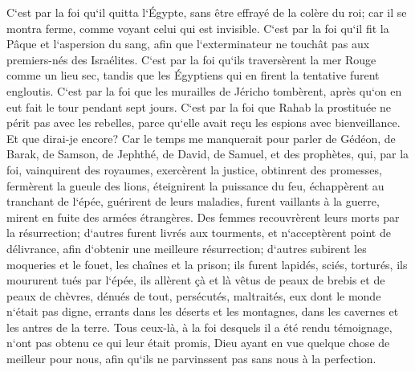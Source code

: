 \verse C`est par la foi qu`il quitta l`Égypte, sans être effrayé de la colère du roi; car il se montra ferme, comme voyant celui qui est invisible. 
\verse C`est par la foi qu`il fit la Pâque et l`aspersion du sang, afin que l`exterminateur ne touchât pas aux premiers-nés des Israélites. 
\verse C`est par la foi qu`ils traversèrent la mer Rouge comme un lieu sec, tandis que les Égyptiens qui en firent la tentative furent engloutis. 
\verse C`est par la foi que les murailles de Jéricho tombèrent, après qu`on en eut fait le tour pendant sept jours. 
\verse C`est par la foi que Rahab la prostituée ne périt pas avec les rebelles, parce qu`elle avait reçu les espions avec bienveillance. 
\verse Et que dirai-je encore? Car le temps me manquerait pour parler de Gédéon, de Barak, de Samson, de Jephthé, de David, de Samuel, et des prophètes, 
\verse qui, par la foi, vainquirent des royaumes, exercèrent la justice, obtinrent des promesses, fermèrent la gueule des lions, 
\verse éteignirent la puissance du feu, échappèrent au tranchant de l`épée, guérirent de leurs maladies, furent vaillants à la guerre, mirent en fuite des armées étrangères. 
\verse Des femmes recouvrèrent leurs morts par la résurrection; d`autres furent livrés aux tourments, et n`acceptèrent point de délivrance, afin d`obtenir une meilleure résurrection; 
\verse d`autres subirent les moqueries et le fouet, les chaînes et la prison; 
\verse ils furent lapidés, sciés, torturés, ils moururent tués par l`épée, ils allèrent çà et là vêtus de peaux de brebis et de peaux de chèvres, dénués de tout, persécutés, maltraités, 
\verse eux dont le monde n`était pas digne, errants dans les déserts et les montagnes, dans les cavernes et les antres de la terre. 
\verse Tous ceux-là, à la foi desquels il a été rendu témoignage, n`ont pas obtenu ce qui leur était promis, 
\verse Dieu ayant en vue quelque chose de meilleur pour nous, afin qu`ils ne parvinssent pas sans nous à la perfection. 

